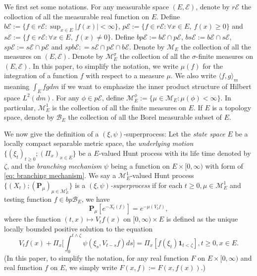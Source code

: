 \documentclass[12pt, a4paper]{amsart}
\theoremstyle{definition}
\numberwithin{equation}{section}
\begin{document}
	We first set some notations.
	For any measurable space $(E,\mathscr E)$, denote by $r\mathscr E$ the colloction of all the measurable real function on $E$. 
	Define $b\mathscr E :=\{f \in r\mathscr E: \sup_{x\in E}|f(x)|<\infty \}$, $p\mathscr E :=\{f\in r\mathscr E: \forall x\in E,~f(x)\geq 0\}$ and $s\mathscr E :=\{f\in r\mathscr E: \forall x\in E,~f(x)\neq 0\}$. 
	Define $bp\mathscr E := b\mathscr E \cap p\mathscr E$, $bs\mathscr E:= b\mathscr E \cap s\mathscr E$, $sp\mathscr E:= s\mathscr E \cap p\mathscr E$ and $spb\mathscr E : = s\mathscr E \cap p\mathscr E \cap b\mathscr E$.	
	Denote by $\mathcal M_E$ the collection of all the measures on $(E,\mathscr E)$.
	Denote by $\mathcal M^\sigma_E$ the collection of all the $\sigma$-finite measures on $(E,\mathscr E)$. 
	In this paper, to simplify the notation, we write $\mu(f)$ for the integration of a function $f$ with respect to a measure $\mu$. 
	We also write $\langle f,g\rangle_m$ meaning $ \int_E fg dm$ if we want to emphasize the inner product structure of Hilbert space $L^2(dm)$.
	For any $\phi \in p\mathscr E$, define $\mathcal M^\phi_E:= \{\mu \in \mathcal M_E: \mu(\phi) < \infty\}$.
	In particular, $\mathcal M^1_E$ is the collection of all the finite measures on $E$.
	If $E$ is a topology space, denote by $\mathscr B_E$ the collection of all the Borel measurable subset of $E$. 
	
	We now give the definition of a $(\xi, \psi)$-superprocess: 
	Let the \emph{state space} $E$ be a locally compact separable metric space,
	the \emph{underlying motion} $\{(\xi_t)_{t\geq 0};(\Pi_x)_{x\in E}\}$ be a $E$-valued Hunt process with its life time denoted by $\zeta$, and the \emph{branching mechanism} $\psi$ being a function on $ E\times [0,\infty)$ with form of \eqref{eq: branching mechanism}.
	We say a $\mathcal M^1_E$-valued Hunt process $\{(X_t); (\mathbf P_\mu)_{\mu \in \mathcal M^1_E}\}$ is a \emph{$(\xi,\psi)$-superprocess} if for each $t\geq 0, \mu \in \mathcal M_E^1$ and  testing function $f\in bp\mathscr B_E$, we have
\[
	\mathbf P_\mu [e^{-X_t(f)}] = e^{-\mu(V_tf)},
\] 
	where the function $(t,x) \mapsto V_tf(x)$ on $[0,\infty) \times E$ is defined as the unique locally bounded positive solution to the equation
\[\label{eq:FKPP_in_definition}
	V_t f(x) + \Pi_x \Big[  \int_0^{t\wedge \zeta} \psi (\xi_s,V_{t-s} f) ds \Big]
	=\Pi_x [ f(\xi_t)\mathbf 1_{t<\zeta} ],
	t\geq 0, x \in E.
\]
	(In this paper, to simplify the notation, for any real function $F$ on $E\times [0,\infty)$ and real function $f$ on $E$, we simply write $F(x,f):= F(x,f(x)).$)
\end{document}
